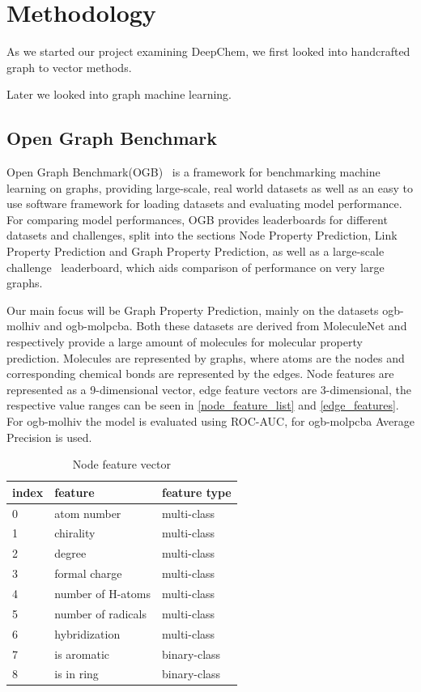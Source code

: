 \section{Methodology}

As we started our project examining DeepChem, we first looked into handcrafted graph to vector methods.

Later we looked into graph machine learning.

\subsection{Open Graph Benchmark}
Open Graph Benchmark(OGB)~\cite{2021ogb} is a framework for benchmarking machine learning on graphs, providing large-scale, real world datasets as well as an easy to use software framework for loading  datasets and evaluating model performance.
For comparing model performances, OGB provides leaderboards for different datasets and challenges, split into the sections Node Property Prediction, Link Property Prediction and Graph Property Prediction, as well as a large-scale challenge~\cite{hu2021ogblsc} leaderboard, which aids comparison of performance on very large graphs.

Our main focus will be Graph Property Prediction, mainly on the datasets ogb-molhiv and ogb-molpcba. Both these datasets are derived from MoleculeNet and respectively provide a large amount of molecules for molecular property prediction. Molecules are represented by graphs, where atoms are the nodes and corresponding chemical bonds are represented by the edges. Node features are represented as a 9-dimensional vector, edge feature vectors are 3-dimensional, the respective value ranges can be seen in \autoref{node_feature_list} and \autoref{edge_features}.
For ogb-molhiv the model is evaluated using ROC-AUC, for ogb-molpcba Average Precision is used.

\begin{table}
    \centering
    \begin{tabular}{lll} %
        \toprule
        index & feature            & feature type \\ \midrule
        0     & atom number        & multi-class  \\
        1     & chirality          & multi-class  \\
        2     & degree             & multi-class  \\
        3     & formal charge      & multi-class  \\
        4     & number of H-atoms  & multi-class  \\
        5     & number of radicals & multi-class  \\
        6     & hybridization      & multi-class  \\
        7     & is aromatic        & binary-class \\
        8     & is in ring         & binary-class \\ \bottomrule
    \end{tabular}
    \caption{Node feature vector}
    \label{node_feature_list}
\end{table}

